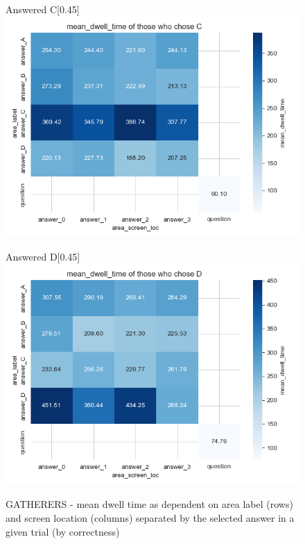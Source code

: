 \documentclass{article}
\begin{document}
\begin{figure}[H]
          \vspace{1em} 
        
          \begin{subcaptionbox}{Answered C\label{fig:C6}}[0.45\textwidth]
            {\centering\includegraphics[width=\linewidth]{plots/matrix_plots/matrix_mean_dwell_time_C_gatherers.png}}
          \end{subcaptionbox}
          \hfill
          \begin{subcaptionbox}{Answered D\label{fig:D6}}[0.45\textwidth]
            {\centering\includegraphics[width=\linewidth]{plots/matrix_plots/matrix_mean_dwell_time_D_gatherers.png}}
          \end{subcaptionbox}
          
          \caption{GATHERERS - mean dwell time as dependent on area label (rows) and screen location (columns) separated by the selected answer in a given trial (by correctness)}
          \label{fig:gath_dwell}
        \end{figure}
\end{document}
